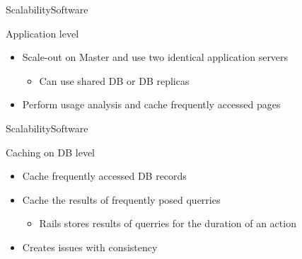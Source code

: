 \begin{frame}{Scalability}{Software}
\begin{block}{Application level}
  \begin{itemize}
    \item Scale-out on Master and use two identical application servers
    \begin{itemize}
			\item Can use shared DB or DB replicas 
		\end{itemize}
    \item Perform usage analysis and cache frequently accessed pages 
  \end{itemize}
\end{block}
\end{frame}

\begin{frame}{Scalability}{Software}
\begin{block}{Caching on DB level}
  \begin{itemize}
    \item Cache frequently accessed DB records
    \item Cache the results of frequently posed querries
    	\begin{itemize}
				\item Rails stores results of querries for the duration of an action 
			\end{itemize}
		\item Creates issues with consistency
  \end{itemize}
\end{block}
\end{frame}